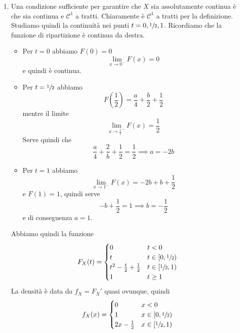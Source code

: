 \documentclass[a4paper]{article}
\begin{document}
\begin{snippetsolution}{}
    \begin{enumerate}
        \item Una condizione sufficiente per garantire che \(X\)
            sia assolutamente continua è che sia continua e \(\mathcal C^1\) a tratti.
            Chiaramente è \(\mathcal C^1\) a tratti per la definizione.
            Studiamo quindi la continuità nei punti \(t=0, \sfrac12, 1\).
            Ricordiamo che la funzione di ripartizione è continua da destra.
            \begin{itemize}
                \item Per \(t=0\) abbiamo \(F(0) = 0\) \[
                        \lim_{x \to 0^-} F(x) = 0
                    \]
                    e quindi è continua.
                \item Per \(t=\sfrac12\) abbiamo \[
                        F\left(\frac12\right) = \frac{a}{4} + \frac b2 + \frac12
                    \]
                    mentre il limite
                    \[
                        \lim_{x \to {\frac12}^-} F(x) = \frac12
                    \]
                    Serve quindi che \[
                        \frac a4 + \frac 2b + \frac12 = \frac12 \implies a = -2b
                    \]
                \item Per \(t=1\) abbiamo \[
                        \lim_{x \to 1^-} F(x) = -2b + b + \frac12
                    \]
                    e \(F(1) = 1\), quindi serve \[
                        -b + \frac12 = 1 \implies b = -\frac12
                    \]
                    e di conseguenza \(a=1\).
            \end{itemize}
            Abbiamo quindi la funzione \[
                F_X(t) =
                \begin{cases}
                    0 & t < 0 \\
                    t & t \in [0,\sfrac12) \\
                    t^2 - \frac t2 + \frac12 & t \in [\sfrac12, 1) \\
                    1 & t \geq 1
                \end{cases}
            \]
            La densità è data da
            \(f_X = F_X'\) quasi ovunque, quindi \[
                f_X(x) =
                \begin{cases}
                    0 & x < 0 \\
                    1 & x \in [0,\sfrac12) \\
                    2x - \frac12 & x \in [\sfrac12, 1) \\

\end{cases}\]
\end{enumerate}
\end{snippetsolution}
\end{document}
